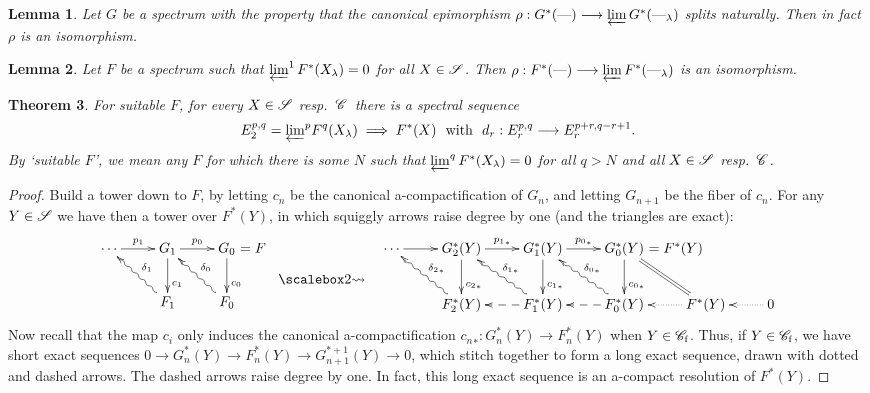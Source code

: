 \documentclass[11pt]{article}
\theoremstyle{plain}
\newtheorem{thm}{Theorem}[subsection]
\newtheorem{lem}[thm]{Lemma}
\theoremstyle{definition}
\newcommand{\CW}{\scrC}
\newcommand{\Specf}{\scrC_\textup{f}}
\begin{document}
{\setcounter{thm}{8}
\begin{lem}
Let $G$ be a spectrum with the property that the canonical epimorphism
$\rho:G^*(\DASH)\to \varprojlim G^*(\DASH_\lambda)$ splits naturally. Then in
fact $\rho$ is an isomorphism.
\end{lem}
\begin{lem}
Let $F$ be a spectrum such that $\varprojlim^1 F^*(X_\lambda)=0$ for all
$X\in\scrS$. Then $\rho:F^*(\DASH)\to \varprojlim F^*(\DASH_\lambda)$ is an
isomorphism.
\end{lem}
\begin{thm}
For suitable $F$, for every $X\in\scrS$ \lparen resp.\ $\CW$\rparen\ there is a
spectral sequence\upcol
\[E_2^{p,q}={\textstyle\varprojlim^p}F^q(X_\lambda)\implies F^*(X)
\text{\ \ with\ \ }d_r:E_r^{p,q}\to E_r^{p+r,q-r+1}.\]
By `suitable $F$', we mean any $F$ for which there is some $N$ such that
$\varprojlim^q F^*(X_\lambda)=0$ for all $q>N$ and all $X\in\scrS$ \lparen
resp.\ $\CW$\rparen.
\end{thm}
\begin{proof}
Build a tower down to $F$, by letting $c_n$ be the canonical a-compactification
of $G_n$, and letting $G_{n+1}$ be the fiber of $c_n$. For any $Y\in\scrS$ we
have then a tower over $F^*(Y)$, in which squiggly arrows raise degree by one
(and the triangles are exact):
\[\xymatrix{
\cdots\ar[r]^{p_1}&
G_1\ar[r]^{p_0}\ar[d]^(.65){c_1}&
G_0\ar[d]^(.65){c_0}\makebox[0cm][l]{\ $=F$}\\
&F_1\ar@{~>}[lu]_{\delta_1}
&F_0\ar@{~>}[lu]_{\delta_0}
}\ \ \ \ \ \ \ \raisebox{-.78cm}{\bigrightsquig}\ \ \ 
\xymatrix{
\cdots\ar[r]&
G^*_2(Y)\ar[r]^{{p_1}_*}\ar[d]^(.65){{c_2}_*}&
G^*_1(Y)\ar[r]^{{p_0}_*}\ar[d]^(.65){{c_1}_*}&
G^*_0(Y)\ar[d]^(.65){{c_0}_*}\makebox[0cm][l]{\ $=F^*(Y)$}\\%
&F^*_2(Y)\ar@{~>}[lu]_{{\delta_2}_*}
&F^*_1(Y)\ar@{~>}[lu]_{{\delta_1}_*}\ar@{-->}[l]
&F^*_0(Y)\ar@{~>}[lu]_{{\delta_0}_*}\ar@{-->}[l]
&\ar@{.>}[l]F^*(Y)\ar@{=}[lu]&\ar@{.>}[l]0
}\]
Now recall that the map $c_i$ only induces the canonical a-compactification
${c_n}_*:G_n^*(Y)\to F_n^*(Y)$ when $Y\in\Specf$. Thus, if $Y\in\Specf$, we have
short exact sequences $0\to G_n^*(Y)\to F_n^*(Y)\to G_{n+1}^{*+1}(Y)\to0$, which
stitch together to form a long exact sequence, drawn with dotted and dashed
arrows. The dashed arrows raise degree by one. In fact, this long exact sequence
is an a-compact resolution of $F^*(Y)$.


\end{proof}}
\end{document}

